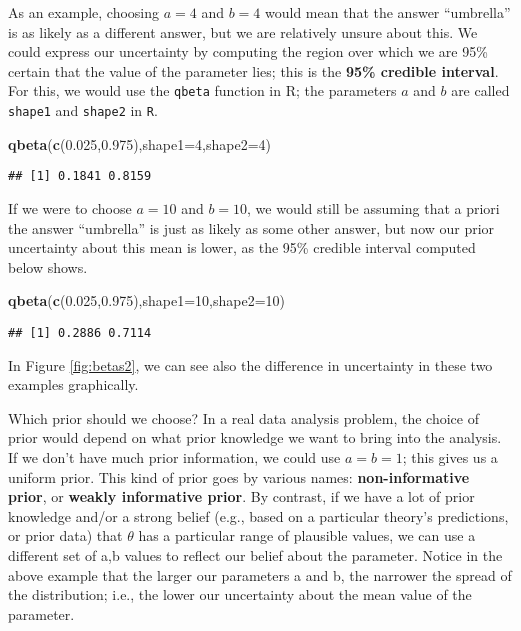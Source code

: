 \documentclass[12pt,]{krantz}
\newenvironment{Shaded}{\begin{snugshade}}{\end{snugshade}}
\newcommand{\DataTypeTok}[1]{\textcolor[rgb]{0.13,0.29,0.53}{#1}}
\newcommand{\DecValTok}[1]{\textcolor[rgb]{0.00,0.00,0.81}{#1}}
\newcommand{\FloatTok}[1]{\textcolor[rgb]{0.00,0.00,0.81}{#1}}
\newcommand{\KeywordTok}[1]{\textcolor[rgb]{0.13,0.29,0.53}{\textbf{#1}}}
\newcommand{\NormalTok}[1]{#1}
\begin{document}
As an example, choosing \(a=4\) and \(b=4\) would mean that the answer ``umbrella'' is as likely as a different answer, but we are relatively unsure about this. We could express our uncertainty by computing the region over which we are 95\% certain that the value of the parameter lies; this is the \textbf{95\% credible interval}. For this, we would use the \texttt{qbeta} function in R; the parameters \(a\) and \(b\) are called \texttt{shape1} and \texttt{shape2} in \texttt{R}.

\begin{Shaded}
\begin{Highlighting}[]
\KeywordTok{qbeta}\NormalTok{(}\KeywordTok{c}\NormalTok{(}\FloatTok{0.025}\NormalTok{,}\FloatTok{0.975}\NormalTok{),}\DataTypeTok{shape1=}\DecValTok{4}\NormalTok{,}\DataTypeTok{shape2=}\DecValTok{4}\NormalTok{)}
\end{Highlighting}
\end{Shaded}

\begin{verbatim}
## [1] 0.1841 0.8159
\end{verbatim}

If we were to choose \(a=10\) and \(b=10\), we would still be assuming that a priori the answer ``umbrella'' is just as likely as some other answer, but now our prior uncertainty about this mean is lower, as the 95\% credible interval computed below shows.

\begin{Shaded}
\begin{Highlighting}[]
\KeywordTok{qbeta}\NormalTok{(}\KeywordTok{c}\NormalTok{(}\FloatTok{0.025}\NormalTok{,}\FloatTok{0.975}\NormalTok{),}\DataTypeTok{shape1=}\DecValTok{10}\NormalTok{,}\DataTypeTok{shape2=}\DecValTok{10}\NormalTok{)}
\end{Highlighting}
\end{Shaded}

\begin{verbatim}
## [1] 0.2886 0.7114
\end{verbatim}

In Figure \ref{fig:betas2}, we can see also the difference in uncertainty in these two examples graphically.

Which prior should we choose? In a real data analysis problem, the choice of prior would depend on what prior knowledge we want to bring into the analysis. If we don't have much prior information, we could use \(a=b=1\); this gives us a uniform prior. This kind of prior goes by various names: \textbf{non-informative prior}, or \textbf{weakly informative prior}. By contrast, if we have a lot of prior knowledge and/or a strong belief (e.g., based on a particular theory's predictions, or prior data) that \(\theta\) has a particular range of plausible values, we can use a different set of a,b values to reflect our belief about the parameter. Notice in the above example that the larger our parameters a and b, the narrower the spread of the distribution; i.e., the lower our uncertainty about the mean value of the parameter.
\end{document}
